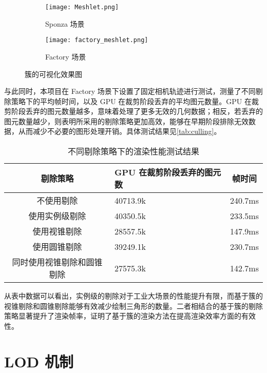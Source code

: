 \begin{figure*}[htbp]
    \centering

    \begin{subfigure}[b]{0.48\linewidth}
        \centering
        \texttt{[image: Meshlet.png]}
        \caption{Sponza 场景}
    \end{subfigure}
    \hfill
    \begin{subfigure}[b]{0.48\linewidth}
        \centering
        \texttt{[image: factory\_meshlet.png]}
        \caption{Factory 场景}
    \end{subfigure}

    \caption{簇的可视化效果图}
    \vspace{-0.2cm}
    \label{fig:Meshlet}
\end{figure*}

与此同时，本项目在 Factory 场景下设置了固定相机轨迹进行测试，测量了不同剔除策略下的平均帧时间，以及 GPU 在裁剪阶段丢弃的平均图元数量。GPU 在裁剪阶段丢弃的图元数量越多，意味着处理了更多无效的几何数据；相反，若丢弃的图元数量越少，则表明所采用的剔除策略更加高效，能够在早期阶段排除无效数据，从而减少不必要的图形处理开销。具体测试结果见\autoref{tab:culling}。

\begin{table}[H]
    \caption{\label{tab:culling}不同剔除策略下的渲染性能测试结果}
    \begin{tabularx}{\linewidth}{|c|X<{\centering}|c|}
        \hline
        剔除策略 & GPU 在裁剪阶段丢弃的图元数 & 帧时间 \\ \hline
        不使用剔除 & 40713.9k & 240.7ms \\ \hline
        使用实例级剔除 & 40350.5k & 233.5ms \\ \hline
        使用视锥剔除 & 28557.5k & 147.9ms \\ \hline
        使用圆锥剔除 & 39249.1k & 230.7ms \\ \hline
        同时使用视锥剔除和圆锥剔除 & 27575.3k & 142.7ms \\ \hline
    \end{tabularx}
\end{table}

从表中数据可以看出，实例级的剔除对于工业大场景的性能提升有限，而基于簇的视锥剔除和圆锥剔除能够有效减少绘制三角形的数量。二者相结合的基于簇的剔除策略显著提升了渲染帧率，证明了基于簇的渲染方法在提高渲染效率方面的有效性。

\section{LOD 机制}

